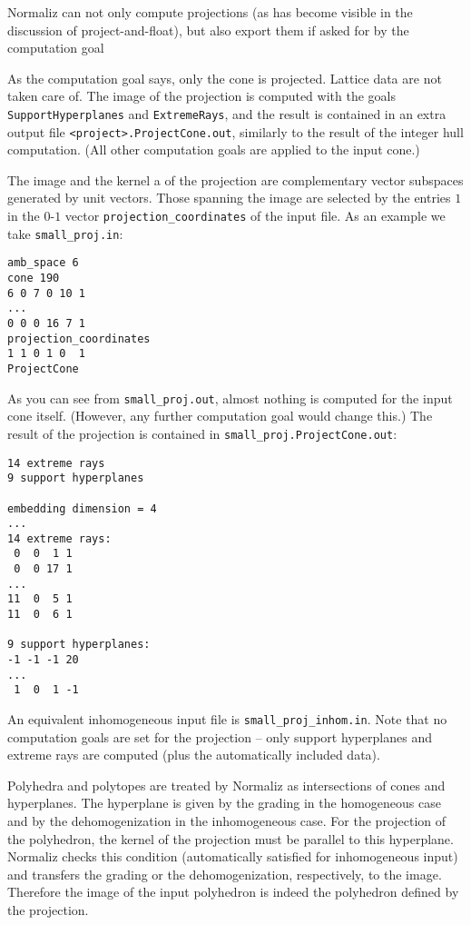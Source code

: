 Normaliz can not only compute projections (as has become visible in the discussion of project-and-float), but also export them if asked for by the computation goal
\begin{itemize}
	\itemtt[ProjectCone]
\end{itemize}
As the computation goal says, only the cone is projected. Lattice data are not taken care of. The image of the projection is computed with the goals \verb|SupportHyperplanes| and \verb|ExtremeRays|, and the result is contained in an extra output file \verb|<project>.ProjectCone.out|, similarly to the result of the integer hull computation. (All other computation goals are applied to the input cone.)

The image and the kernel a of the projection are complementary vector subspaces generated by unit vectors. Those spanning the image are selected by the entries $1$ in the $0$-$1$ vector \verb|projection_coordinates| of the input file. As an example we take
\verb|small_proj.in|:
\begin{Verbatim}
amb_space 6
cone 190
6 0 7 0 10 1
...
0 0 0 16 7 1
projection_coordinates
1 1 0 1 0  1
ProjectCone
\end{Verbatim}
As you can see from \verb|small_proj.out|, almost nothing is computed for the input cone itself. (However, any further computation goal would change this.) The result of the projection is contained in \verb|small_proj.ProjectCone.out|:
\begin{Verbatim}
14 extreme rays
9 support hyperplanes

embedding dimension = 4
...
14 extreme rays:
 0  0  1 1
 0  0 17 1
...
11  0  5 1
11  0  6 1

9 support hyperplanes:
-1 -1 -1 20
...
 1  0  1 -1
\end{Verbatim}
An equivalent inhomogeneous input file is \verb|small_proj_inhom.in|. Note that no computation goals are set for the projection -- only support hyperplanes and extreme rays are computed (plus the automatically included data).

Polyhedra and polytopes are treated by Normaliz as intersections of cones and hyperplanes. The hyperplane is given by the grading in the homogeneous case and by the dehomogenization in the inhomogeneous case. For the projection of the polyhedron, the kernel of the projection must be parallel to this hyperplane. Normaliz checks this condition (automatically satisfied for inhomogeneous input) and transfers the grading or the dehomogenization, respectively, to the image. Therefore the image of the input polyhedron is indeed the polyhedron defined by the projection.

